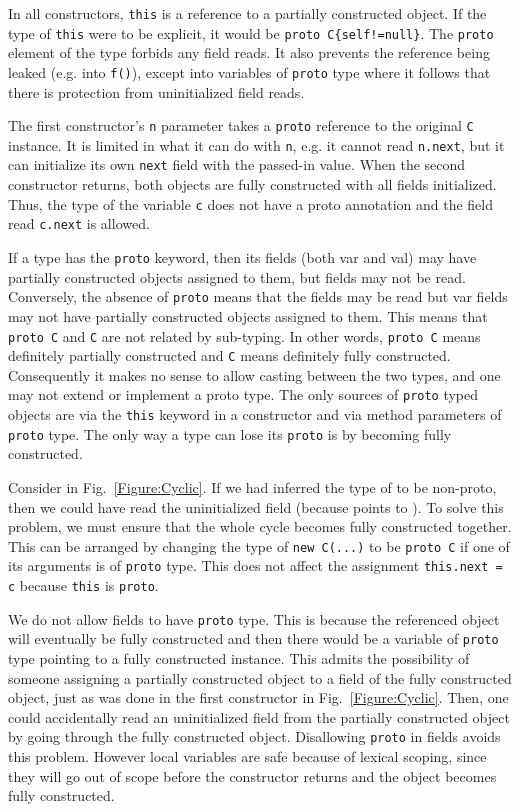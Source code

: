 In all constructors, \texttt{this} is a reference to a partially
    constructed object.
If the type of \texttt{this} were to be explicit, it would
be \texttt{proto C\{self!=null\}}.  The \texttt{proto} element of the type
forbids any field reads.  It also prevents the reference being leaked (e.g.
into \texttt{f()}), except into variables of \texttt{proto} type where it
follows that there is protection from uninitialized field reads.

The first constructor's \texttt{n} parameter takes a \texttt{proto} reference
to the original \texttt{C} instance.  It is limited in what it can do with
\texttt{n}, e.g. it cannot read \texttt{n.next}, but it can initialize its own
\texttt{next} field with the passed-in value.
When the second constructor returns, both objects are fully constructed with
all fields initialized.  Thus, the type of the variable \texttt{c} does not
have a proto annotation and the field read \texttt{c.next} is allowed.

If a type has the \texttt{proto} keyword, then its fields (both var and val)
may have partially constructed objects assigned to them, but fields may not be
read.  Conversely, the absence of \texttt{proto} means that the fields may be
read but var fields may not have partially constructed objects assigned to them.
This means that \texttt{proto C} and \texttt{C} are not related by sub-typing.
In other words, \texttt{proto C} means definitely partially constructed and
\texttt{C} means definitely fully constructed.  Consequently it makes no sense
to allow casting between the two types, and one may not extend or implement a
proto type.  The only sources of \texttt{proto} typed objects are via the
\texttt{this} keyword in a constructor and via method parameters of
\texttt{proto} type.  The only way a type can lose its \texttt{proto} is by
becoming fully constructed.

Consider  in Fig.~\ref{Figure:Cyclic}.
If we had inferred the type of  to be non-proto,
    then we could have read the uninitialized field  (because  points to ).
To solve this problem, we must ensure that the whole cycle becomes fully
constructed together.
This can be arranged by changing the type of \texttt{new
C(...)} to be \texttt{proto C} if one of its arguments is of \texttt{proto}
type.  This does not affect the assignment \texttt{this.next = c} because
\texttt{this} is \texttt{proto}.

We do not allow fields to have \texttt{proto} type.  This is because the
referenced object will eventually be fully constructed and then there would be
a variable of \texttt{proto} type pointing to a fully constructed instance.
This admits the possibility of someone assigning a partially constructed object
to a field of the fully constructed object, just as was done in the first
constructor in Fig.~\ref{Figure:Cyclic}.  Then, one could accidentally read an
uninitialized field from the partially constructed object by going through the
fully constructed object.  Disallowing \texttt{proto} in fields avoids this
problem.  However local variables are safe because of lexical scoping, since they
will go out of scope before the constructor returns and the object becomes
fully constructed.


